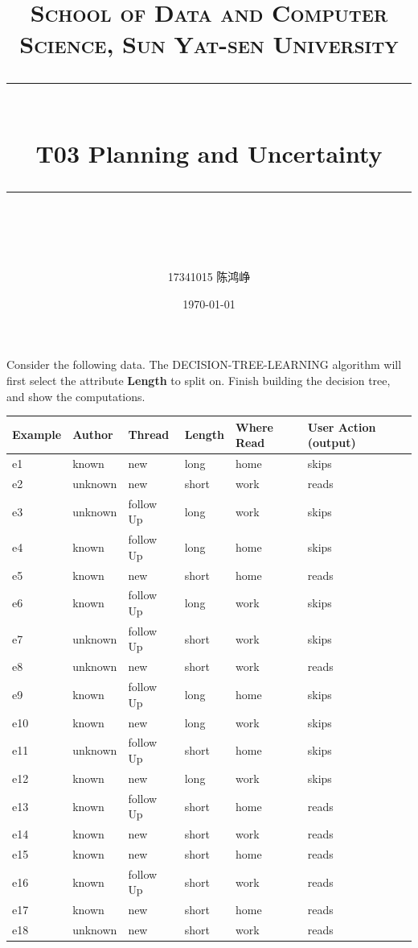 \documentclass[a4paper, 11pt]{article}
\title{
\normalfont \normalsize
\textsc{School of Data and Computer Science, Sun Yat-sen University} \\ [25pt] %
\rule{\textwidth}{0.5pt} \\[0.4cm] %
\huge  T03 Planning and Uncertainty\\ %
\rule{\textwidth}{2pt} \\[0.5cm] %
\author{17341015 陈鸿峥}
\date{\normalsize\today}
}
\begin{document}
\maketitle

\newpage
\begin{question}\normalfont
Consider the following data. The DECISION-TREE-LEARNING algorithm will first select the attribute \textbf{Length} to split on. Finish building the decision tree, and show the computations.
\begin{center}
\begin{tabular}{|l|l|l|l|l|l|}\hline
    \textbf{Example} & \textbf{Author} & \textbf{Thread} & \textbf{Length} & \textbf{Where Read} & \textbf{User Action (output)}\\\hline
    e1 & known & new & long & home & skips\\\hline
    e2 & unknown & new & short & work & reads\\\hline
    e3 & unknown & follow Up & long & work & skips\\\hline
    e4 & known & follow Up & long & home & skips\\\hline
    e5 & known & new & short & home & reads\\\hline
    e6 & known & follow Up & long & work & skips\\\hline
    e7 & unknown & follow Up & short & work & skips\\\hline
    e8 & unknown & new & short & work & reads\\\hline
    e9 & known & follow Up & long & home & skips\\\hline
    e10 & known & new & long & work & skips\\\hline
    e11 & unknown & follow Up & short & home & skips\\\hline
    e12 & known & new & long & work & skips\\\hline
    e13 & known & follow Up & short & home & reads\\\hline
    e14 & known & new & short & work & reads\\\hline
    e15 & known & new & short & home & reads\\\hline
    e16 & known & follow Up & short & work & reads\\\hline
    e17 & known & new & short & home & reads\\\hline
    e18 & unknown & new & short & work & reads\\\hline
\end{tabular}
\end{center}
\end{question}
\end{document}

